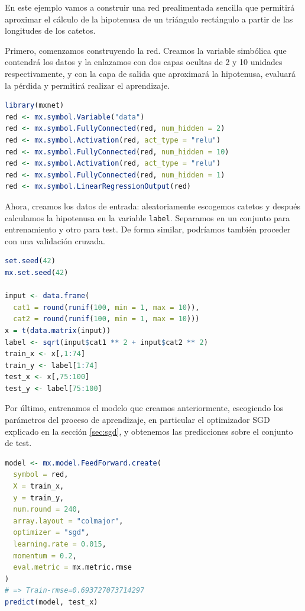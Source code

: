 \begin{example}

  En este ejemplo vamos a construir una red prealimentada sencilla que permitirá aproximar el cálculo de la hipotenusa de un triángulo rectángulo a partir de las longitudes de los catetos.

  Primero, comenzamos construyendo la red. Creamos la variable simbólica que contendrá los datos y la enlazamos con dos capas ocultas de 2 y 10 unidades respectivamente, y con la capa de salida que aproximará la hipotenusa, evaluará la pérdida y permitirá realizar el aprendizaje.
  
\begin{lstlisting}[language=R,frame=none]
library(mxnet)
red <- mx.symbol.Variable("data")
red <- mx.symbol.FullyConnected(red, num_hidden = 2)
red <- mx.symbol.Activation(red, act_type = "relu")
red <- mx.symbol.FullyConnected(red, num_hidden = 10)
red <- mx.symbol.Activation(red, act_type = "relu")
red <- mx.symbol.FullyConnected(red, num_hidden = 1)
red <- mx.symbol.LinearRegressionOutput(red)
\end{lstlisting}
  
  Ahora, creamos los datos de entrada: aleatoriamente escogemos catetos y después calculamos la hipotenusa en la variable \texttt{label}. Separamos en un conjunto para entrenamiento y otro para test. De forma similar, podríamos también proceder con una validación cruzada.
  
\begin{lstlisting}[language=R,frame=none]
set.seed(42)
mx.set.seed(42)

input <- data.frame(
  cat1 = round(runif(100, min = 1, max = 10)),
  cat2 = round(runif(100, min = 1, max = 10)))
x = t(data.matrix(input))
label <- sqrt(input$cat1 ** 2 + input$cat2 ** 2)
train_x <- x[,1:74]
train_y <- label[1:74]
test_x <- x[,75:100]
test_y <- label[75:100]
\end{lstlisting}

Por último, entrenamos el modelo que creamos anteriormente, escogiendo los parámetros del proceso de aprendizaje, en particular el optimizador SGD explicado en la sección \ref{sec:sgd}, y obtenemos las predicciones sobre el conjunto de test.
  
\begin{lstlisting}[language=R,frame=none]
model <- mx.model.FeedForward.create(
  symbol = red,
  X = train_x,
  y = train_y,
  num.round = 240,
  array.layout = "colmajor",
  optimizer = "sgd",
  learning.rate = 0.015,
  momentum = 0.2,
  eval.metric = mx.metric.rmse
)
# => Train-rmse=0.693727073714297
predict(model, test_x)
\end{lstlisting}
  
\end{example}


